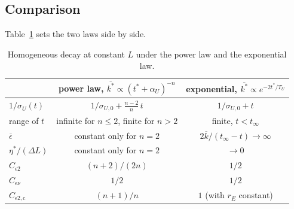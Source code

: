\documentclass{article}
\begin{document}
\subsection{Comparison}\label{ssec:exp-summary}
Table~\ref{tab:exp-vs-power} sets the two laws side by side.
\begin{table}[h]
  \centering
  \caption{Homogeneous decay at constant $L$ under the power law and the exponential law.}
  \label{tab:exp-vs-power}
  \renewcommand{\arraystretch}{1.4}
  \begin{tabular}{lcc}
    \hline
    & power law, $\overline{k^*} \propto (t^* + \alpha_U)^{-n}$
    & exponential, $\overline{k^*} \propto e^{-2t^*/T_U}$ \\
    \hline
    $1/\sigma_U(t)$
      & $1/\sigma_{U,0} + \frac{n-2}{n}\, t$
      & $1/\sigma_{U,0} + t$ \\
    range of $t$
      & infinite for $n \le 2$, finite for $n > 2$
      & finite, $t < t_\infty$ \\
    $\overline{\epsilon}$
      & constant only for $n = 2$
      & $2\overline{k}/(t_\infty - t) \to \infty$ \\
    $\eta^*/(\Delta L)$
      & constant only for $n = 2$
      & $\to 0$ \\
    $C_{\epsilon 2}$
      & $(n + 2)/(2n)$
      & $1/2$ \\
    $C_{\epsilon\nu}$
      & $1/2$
      & $1/2$ \\
    $C_{\epsilon 2,\mathrm{c}}$
      & $(n + 1)/n$
      & $1$ (with $r_E$ constant) \\
    \hline
  \end{tabular}
\end{table}



\end{document}
